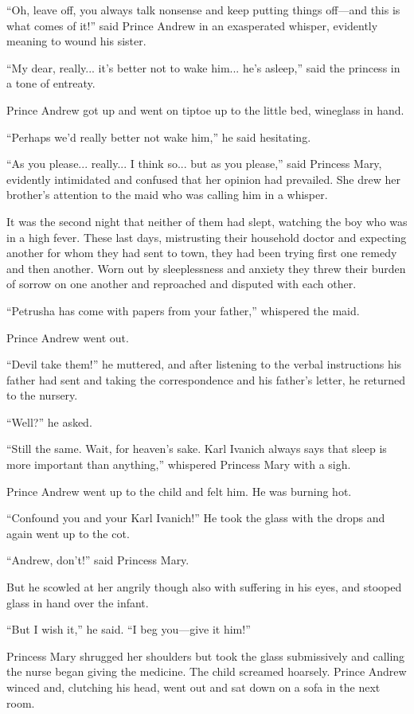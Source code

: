 ``Oh, leave off, you always talk nonsense and keep putting things
off---and this is what comes of it!'' said Prince Andrew in an
exasperated whisper, evidently meaning to wound his sister.

``My dear, really... it's better not to wake him... he's
asleep,'' said the princess in a tone of entreaty.

Prince Andrew got up and went on tiptoe up to the little bed,
wineglass in hand.

``Perhaps we'd really better not wake him,'' he said hesitating.

``As you please... really... I think so... but as you please,''
said Princess Mary, evidently intimidated and confused that her
opinion had prevailed. She drew her brother's attention to the
maid who was calling him in a whisper.

It was the second night that neither of them had slept, watching
the boy who was in a high fever. These last days, mistrusting
their household doctor and expecting another for whom they had
sent to town, they had been trying first one remedy and then
another. Worn out by sleeplessness and anxiety they threw their
burden of sorrow on one another and reproached and disputed with
each other.

``Petrusha has come with papers from your father,'' whispered the
maid.

Prince Andrew went out.

``Devil take them!'' he muttered, and after listening to the
verbal instructions his father had sent and taking the
correspondence and his father's letter, he returned to the
nursery.

``Well?'' he asked.

``Still the same. Wait, for heaven's sake. Karl Ivanich always
says that sleep is more important than anything,'' whispered
Princess Mary with a sigh.

Prince Andrew went up to the child and felt him. He was burning
hot.

``Confound you and your Karl Ivanich!'' He took the glass with
the drops and again went up to the cot.

``Andrew, don't!'' said Princess Mary.

But he scowled at her angrily though also with suffering in his
eyes, and stooped glass in hand over the infant.

``But I wish it,'' he said. ``I beg you---give it him!''

Princess Mary shrugged her shoulders but took the glass
submissively and calling the nurse began giving the medicine. The
child screamed hoarsely. Prince Andrew winced and, clutching his
head, went out and sat down on a sofa in the next room.

